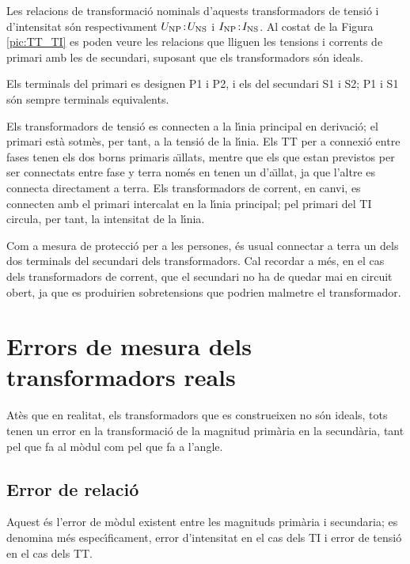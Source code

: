 Les relacions de transformaci\'{o} nominals d'aquests transformadors de
tensi\'{o} i d'intensitat s\'{o}n respectivament $U_\mathrm{NP}\!:\!U_\mathrm{NS}$ i
$I_\mathrm{NP}\!:\!I_\mathrm{NS}$. Al costat de la Figura
\vref{pic:TT_TI} es poden veure les relacions que lliguen les
tensions i corrents de primari amb les de secundari, suposant que
els transformadors s\'{o}n ideals.

Els terminals del primari es designen \textsf{P1} i \textsf{P2}, i
els del secundari \textsf{S1} i \textsf{S2}; \textsf{P1} i
\textsf{S1} s\'{o}n sempre terminals equivalents.

Els transformadors de tensi\'{o} es connecten a la l\'{\i}nia principal en
derivaci\'{o}; el  primari est\`{a} sotm\`{e}s, per tant, a la tensi\'{o} de la
l\'{\i}nia. Els TT per a connexi\'{o} entre fases tenen els dos borns
primaris a\"{\i}llats, mentre que els que estan previstos per ser
connectats entre fase y terra nom\'{e}s en tenen un d'a\"{\i}llat, ja que
l'altre es connecta directament a terra. Els transformadors de
corrent, en canvi, es connecten amb el primari intercalat en la
l\'{\i}nia principal;  pel primari del TI circula, per tant, la
intensitat de la l\'{\i}nia.

 Com a mesura de protecci\'{o} per a les persones, \'{e}s usual
connectar a terra un dels dos terminals del secundari dels
transformadors. Cal recordar a m\'{e}s, en el cas dels transformadors de
corrent, que el secundari no ha de quedar mai en circuit obert, ja
que es produirien sobretensions que podrien malmetre el
transformador.

\section{Errors de mesura dels transformadors reals}

At\`{e}s que en realitat, els transformadors que es construeixen no s\'{o}n
ideals, tots tenen un error en la transformaci\'{o} de la magnitud
prim\`{a}ria en la secund\`{a}ria, tant pel que fa al m\`{o}dul com pel que fa
a l'angle.

\subsection{Error de relaci\'{o}}

Aquest \'{e}s l'error de m\`{o}dul existent entre les magnituds prim\`{a}ria i
secundaria; es denomina m\'{e}s espec\'{\i}ficament, error d'intensitat en el
cas dels TI i error de tensi\'{o} en el cas dels TT.

